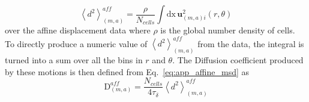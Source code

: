 \documentclass[
reprint
,aps
,amssymb
,amsmath
,superscriptaddress
]{revtex4-1}
\begin{document}
%
\begin{equation}\label{eq:app_displacement_averaging_affine}
\left \langle d^2 \right\rangle^{aff}_{(m,a)} =\frac{\rho}{N_{cells}} \int \mathrm{d} \mathrm{x} \, \mathbf{u}^2_{(m,a)i}(r, \theta)
\end{equation}
% 
over the affine displacement data where $\rho$ is the global number density of cells. To directly produce a numeric value of $\left \langle d^2 \right\rangle^{aff}_{(m,a)}$ from the data, the integral is turned into a sum over all the bins in $r$ and $\theta$. The Diffusion coefficient produced by these motions is then defined from Eq.~\ref{eq:app_affine_msd} as 
%
\begin{equation}\label{eq:app_affine_diffusion}
\mathrm{D}^{aff}_{(m,a)} = \frac{N_{cells}}{4 \tau_\delta} \left \langle d^2 \right\rangle^{aff}_{(m,a)}
\end{equation}
%
\end{document}
